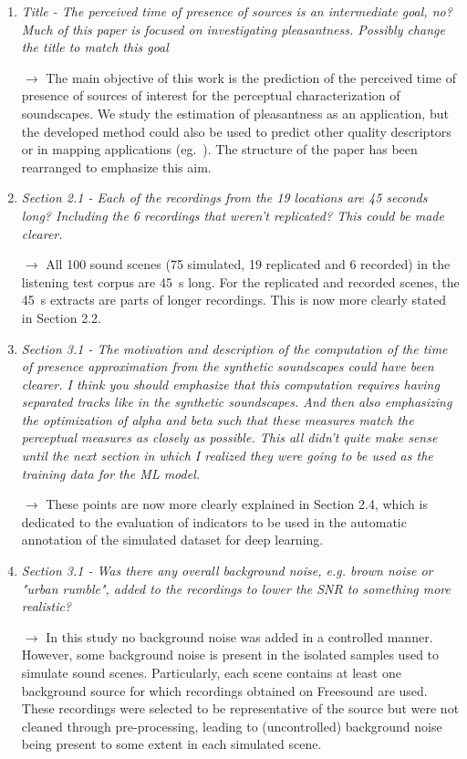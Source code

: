 \documentclass[10pt]{article}
\begin{document}
\begin{enumerate}
\item \emph{Title - The perceived time of presence of sources is an intermediate goal, no? Much of this paper is focused on investigating pleasantness. Possibly change the title to match this goal}

$\rightarrow$ The main objective of this work is the prediction of the perceived time of presence of sources of interest for the perceptual characterization of soundscapes. We study the estimation of pleasantness as an application, but the developed method could also be used to predict other quality descriptors or in mapping applications (eg.~\cite{lavandier2016}). The structure of the paper has been rearranged to emphasize this aim.

\item \emph{Section 2.1 - Each of the recordings from the 19 locations are 45 seconds long? Including the 6 recordings that weren't replicated? This could be made clearer.}

$\rightarrow$ All 100 sound scenes (75 simulated, 19 replicated and 6 recorded) in the listening test corpus are 45~s long. For the replicated and recorded scenes, the 45~s extracts are parts of longer recordings. This is now more clearly stated in Section 2.2.

\item \emph{Section 3.1 - The motivation and description of the computation of the time of presence approximation from the synthetic soundscapes could have been clearer. I think you should emphasize that this computation requires having separated tracks like in the synthetic soundscapes. And then also emphasizing the optimization of alpha and beta such that these measures match the perceptual measures as closely as possible. This all didn't quite make sense until the next section in which I realized they were going to be used as the training data for the ML model.}

$\rightarrow$ These points are now more clearly explained in Section 2.4, which is dedicated to the evaluation of indicators to be used in the automatic annotation of the simulated dataset for deep learning.

\item \emph{Section 3.1 - Was there any overall background noise, e.g. brown noise or "urban rumble", added to the recordings to lower the SNR to something more realistic?}

$\rightarrow$ In this study no background noise was added in a controlled manner. However, some background noise is present in the isolated samples used to simulate sound scenes. Particularly, each scene contains at least one background source for which recordings obtained on Freesound are used. These recordings were selected to be representative of the source but were not cleaned through pre-processing, leading to (uncontrolled) background noise being present to some extent in each simulated scene.


\end{enumerate}
\end{document}
